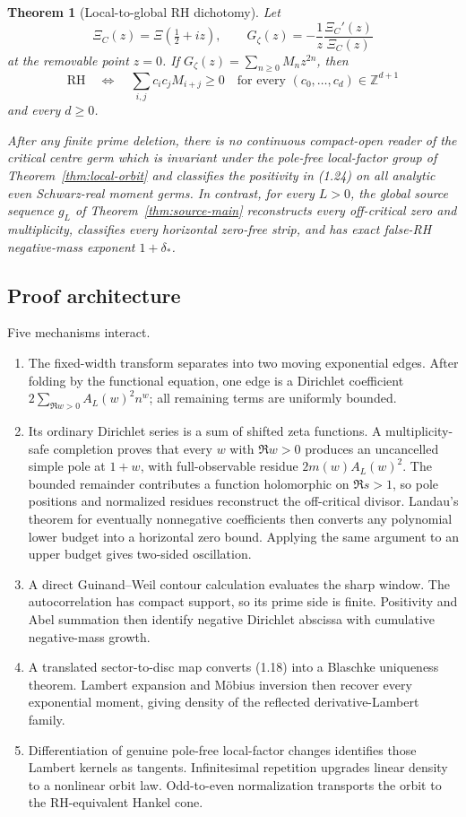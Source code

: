 \documentclass[11pt]{article}
\newtheorem{theorem}{Theorem}[section]
\begin{document}
\begin{theorem}[Local-to-global RH dichotomy]\label{thm:dichotomy}
Let
\[
 \Xi_C(z)=\Xi(\tfrac12+iz),\qquad
 G_\zeta(z)=-\frac1z\frac{\Xi_C'(z)}{\Xi_C(z)}
\tag{1.23}
\]
at the removable point \(z=0\).  If
\(G_\zeta(z)=\sum_{n\ge0}M_nz^{2n}\), then
\[
 \mathrm{RH}\quad\Longleftrightarrow\quad
 \sum_{i,j}c_ic_jM_{i+j}\ge0
 \quad\text{for every }(c_0,\ldots,c_d)\in\mathbb Z^{d+1}
\tag{1.24}
\]
and every \(d\ge0\).

After any finite prime deletion, there is no continuous compact-open reader of the critical
centre germ which is invariant under the pole-free local-factor group of
Theorem~\ref{thm:local-orbit} and classifies the positivity in (1.24) on all analytic even
Schwarz-real moment germs.  In contrast, for every \(L>0\), the global source sequence \(g_L\)
of Theorem~\ref{thm:source-main} reconstructs every off-critical zero and multiplicity,
classifies every horizontal zero-free strip, and has exact false-RH negative-mass exponent
\(1+\delta_*\).
\end{theorem}

\subsection{Proof architecture}

Five mechanisms interact.
\begin{enumerate}[label=\arabic*.]
\item The fixed-width transform separates into two moving exponential edges.  After folding by
the functional equation, one edge is a Dirichlet coefficient
\(2\sum_{\Re w>0}A_L(w)^2n^w\); all remaining terms are uniformly bounded.
\item Its ordinary Dirichlet series is a sum of shifted zeta functions.  A
multiplicity-safe completion proves that every \(w\) with \(\Re w>0\) produces an uncancelled
simple pole at \(1+w\), with full-observable residue
\(2m(w)A_L(w)^2\).  The bounded remainder contributes a function holomorphic on
\(\Re s>1\), so pole positions and normalized residues reconstruct the off-critical divisor.
Landau's theorem for eventually nonnegative coefficients then converts any polynomial lower
budget into a horizontal zero bound.  Applying the same argument to an upper budget gives
two-sided oscillation.
\item A direct Guinand--Weil contour calculation evaluates the sharp window.  The
autocorrelation has compact support, so its prime side is finite.  Positivity and Abel summation
then identify negative Dirichlet abscissa with cumulative negative-mass growth.
\item A translated sector-to-disc map converts (1.18) into a Blaschke uniqueness theorem.
Lambert expansion and M\"obius inversion then recover every exponential moment, giving density
of the reflected derivative-Lambert family.
\item Differentiation of genuine pole-free local-factor changes identifies those Lambert
kernels as tangents.  Infinitesimal repetition upgrades linear density to a nonlinear orbit
law.  Odd-to-even normalization transports the orbit to the RH-equivalent Hankel cone.
\end{enumerate}
\end{document}
